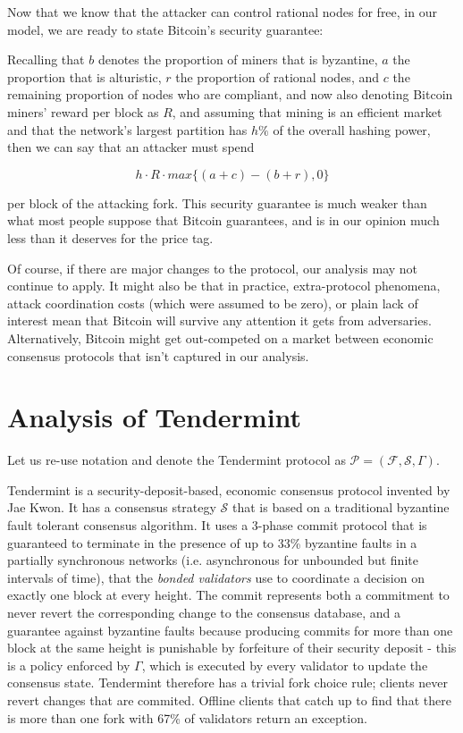 \documentclass[11pt,a4paper]{article}
\theoremstyle{plain}
\theoremstyle{definition}
\begin{document}
Now that we know that the attacker can control rational nodes for free, in our model, we are ready to state Bitcoin's security guarantee:

Recalling that $b$ denotes the proportion of miners that is byzantine, $a$ the proportion that is alturistic, $r$ the proportion of rational nodes, and $c$ the remaining proportion of nodes who are compliant, and now also denoting Bitcoin miners' reward per block as $R$, and assuming that mining is an efficient market and that the network's largest partition has $h\%$ of the overall hashing power, then we can say that an attacker must spend 

$$h \cdot R \cdot max\{(a + c) - (b + r),0\}$$ 

per block of the attacking fork. This security guarantee is much weaker than what most people suppose that Bitcoin guarantees, and is in our opinion much less than it deserves for the price tag. 

Of course, if there are major changes to the protocol, our analysis may not continue to apply. It might also be that in practice, extra-protocol phenomena, attack coordination costs (which were assumed to be zero), or plain lack of interest mean that Bitcoin will survive any attention it gets from adversaries. Alternatively, Bitcoin might get out-competed on a market between economic consensus protocols that isn't captured in our analysis.

\section{Analysis of Tendermint}

Let us re-use notation and denote the Tendermint protocol as $\mathcal{P} = (\mathcal{F}, \mathcal{S}, \Gamma)$. 

Tendermint is a security-deposit-based, economic consensus protocol invented by Jae Kwon\cite{Tendermint}. It has a consensus strategy $\mathcal{S}$ that is based on a traditional byzantine fault tolerant consensus algorithm. It uses a 3-phase commit protocol that is guaranteed to terminate in the presence of up to 33\% byzantine faults in a partially synchronous networks (i.e. asynchronous for unbounded but finite intervals of time), that the \emph{bonded validators} use to coordinate a decision on exactly one block at every height. The commit represents both a commitment to never revert the corresponding change to the consensus database, and a guarantee against byzantine faults because producing commits for more than one block at the same height is punishable by forfeiture of their security deposit - this is a policy enforced by $\Gamma$, which is executed by every validator to update the consensus state. Tendermint therefore has a trivial fork choice rule; clients never revert changes that are commited. Offline clients that catch up to find that there is more than one fork with 67\% of validators return an exception.
\end{document}
